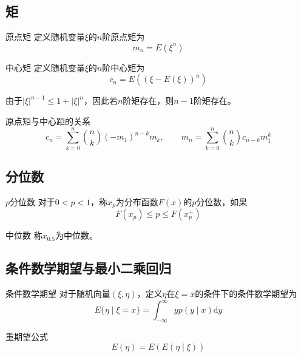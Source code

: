 \documentclass[lang = cn, scheme = chinese, thmcnt = section]{elegantbook}
\begin{document}
\subsection{矩}

\begin{definition}{原点矩}
	定义随机变量$\xi$的$n$阶原点矩为%
	$$
	m_n=E(\xi^n)
	$$
\end{definition}

\begin{definition}{中心矩}
	定义随机变量$\xi$的$n$阶中心矩为%
	$$
	c_n=E((\xi-E(\xi))^n)
	$$
\end{definition}

\begin{note}
	由于$|\xi|^{n-1}\le 1+|\xi|^n$，因此若$n$阶矩存在，则$n-1$阶矩存在。
\end{note}

\begin{proposition}{原点矩与中心距的关系}
	$$
	c_n=\sum_{k=0}^{n}{{n\choose k}(-m_1)^{n-k}m_k},\qquad 
	m_n=\sum_{k=0}^{n}{{n\choose k}c_{n-k}m_1^k}
	$$
\end{proposition}

\subsection{分位数}

\begin{definition}{$p$分位数}
	对于$0<p<1$，称$x_p$为分布函数$F(x)$的$p$分位数，如果
	$$
	F(x_p)\le p\le F(x_p^+)
	$$
\end{definition}

\begin{definition}{中位数}
	称$x_{0.5}$为中位数。
\end{definition}

\subsection{条件数学期望与最小二乘回归}

\begin{definition}{条件数学期望}
	对于随机向量$(\xi,\eta)$，定义$\eta$在$\xi=x$的条件下的条件数学期望为
	$$
	E\{\eta \mid \xi=x\}=\int_{-\infty}^{\infty}{yp(y \mid x)\mathrm{d}y}
	$$
\end{definition}

\begin{proposition}{重期望公式}
	$$
	E(\eta)=E(E(\eta \mid \xi))
	$$
\end{proposition}
\end{document}
